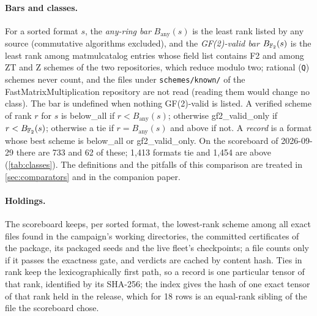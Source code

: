 \paragraph{Bars and classes.}
For a sorted format $s$, the \emph{any-ring bar} $B_{\mathrm{any}}(s)$ is the least rank listed by any source (commutative algorithms excluded), and the \emph{GF(2)-valid bar} $B_{{\mathbb{F}_2}}(s)$ is the least rank among matmulcatalog entries whose field list contains F2 and among ZT and Z schemes of the two repositories, which reduce modulo two; rational (\texttt{Q}) schemes never count, and the files under \texttt{schemes/known/} of the FastMatrixMultiplication repository are not read (reading them would change no class). The bar is undefined when nothing GF(2)-valid is listed.
A verified scheme of rank $r$ for $s$ is \textsf{below\_all} if $r<B_{\mathrm{any}}(s)$; otherwise \textsf{gf2\_valid\_only} if $r<B_{{\mathbb{F}_2}}(s)$; otherwise a \textsf{tie} if $r=B_{\mathrm{any}}(s)$ and \textsf{above} if not.
A \emph{record} is a format whose best scheme is \textsf{below\_all} or \textsf{gf2\_valid\_only}. On the scoreboard of 2026-09-29 there are 733 and 62 of these; 1{,}413 formats tie and 1{,}454 are above (\cref{tab:classes}).
The definitions and the pitfalls of this comparison are treated in \cref{sec:comparators} and in the companion paper.

\paragraph{Holdings.}
The scoreboard keeps, per sorted format, the lowest-rank scheme among all exact files found in the campaign's working directories, the committed certificates of the package, its packaged seeds and the live fleet's checkpoints; a file counts only if it passes the exactness gate, and verdicts are cached by content hash.
Ties in rank keep the lexicographically first path, so a record is one particular tensor of that rank, identified by its SHA-256; the index gives the hash of one exact tensor of that rank held in the release, which for 18 rows is an equal-rank sibling of the file the scoreboard chose.
